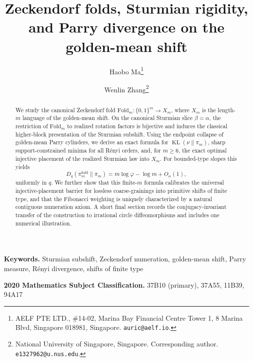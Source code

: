 \documentclass[11pt,a4paper]{article}
\title{Zeckendorf folds, Sturmian rigidity, and Parry divergence on the golden-mean shift}
\author{Haobo Ma\thanks{AELF PTE LTD., \#14-02, Marina Bay Financial Centre Tower 1, 8 Marina Blvd, Singapore 018981, Singapore. \texttt{auric@aelf.io}.}
\and
Wenlin Zhang\thanks{National University of Singapore, Singapore. Corresponding author. \texttt{e1327962@u.nus.edu}.}}
\date{}
\numberwithin{equation}{section}
\theoremstyle{plain}
\theoremstyle{definition}
\theoremstyle{remark}
\newcommand{\Fold}{\mathrm{Fold}}
\DeclareMathOperator{\KL}{KL}
\begin{document}
\maketitle

\begin{abstract}
We study the canonical Zeckendorf fold $\Fold_m:\{0,1\}^m\to X_m$, where
$X_m$ is the length-$m$ language of the golden-mean shift. On the canonical
Sturmian slice $\beta=\alpha$, the restriction of $\Fold_m$ to realized
rotation factors is bijective and induces the classical higher-block
presentation of the Sturmian subshift. Using the endpoint collapse of
golden-mean Parry cylinders, we derive an exact formula for
$\KL(\nu\|\pi_m)$, sharp support-constrained minima for all R\'enyi orders,
and, for $m\ge 6$, the exact optimal injective placement of the realized
Sturmian law into $X_m$. For bounded-type slopes this yields
$$
D_q(\pi_m^{\mathrm{fold}}\|\pi_m)
=m\log\varphi-\log m+O_\alpha(1),
$$
uniformly in $q$. We further show that this finite-$m$ formula calibrates
the universal injective-placement barrier for lossless coarse-grainings into
primitive shifts of finite type, and that the Fibonacci weighting is uniquely
characterized by a natural contiguous numeration axiom. A short final section
records the conjugacy-invariant transfer of the construction to irrational
circle diffeomorphisms and includes one numerical illustration.
\end{abstract}

\medskip
\noindent\textbf{Keywords.} Sturmian subshift, Zeckendorf numeration,
golden-mean shift, Parry measure, R\'enyi divergence, shifts of finite type

\medskip
\noindent\textbf{2020 Mathematics Subject Classification.}
37B10 (primary), 37A55, 11B39, 94A17










\appendix






\end{document}
